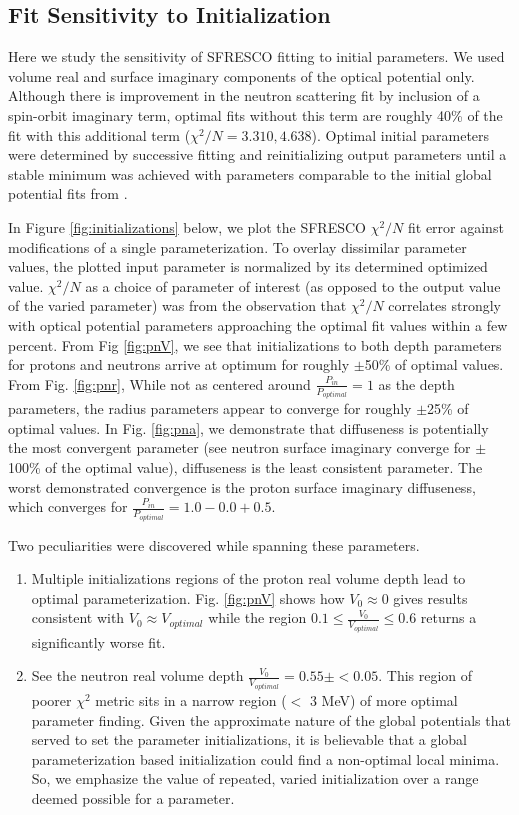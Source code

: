 \subsection{Fit Sensitivity to Initialization}
Here we study the sensitivity of SFRESCO fitting to initial parameters. We used volume real and surface imaginary components of the optical potential only. Although there is improvement in the neutron scattering fit by inclusion of a spin-orbit imaginary term, optimal fits without this term are roughly 40\% of the fit with this additional term ($\chi^2/N = 3.310, 4.638 $). Optimal initial parameters were determined by successive fitting and reinitializing output parameters until a stable minimum was achieved with parameters comparable to the initial global potential fits from \cite{capote2009ripl}.
\par
In Figure \ref{fig:initializations} below, we plot the SFRESCO $\chi^2/N$ fit error against modifications of a single parameterization. To overlay dissimilar parameter values, the plotted input parameter is normalized by its determined optimized value. $\chi^2/N$ as a choice of parameter of interest (as opposed to the output value of the varied parameter) was from the observation that  $\chi^2/N$ correlates strongly with optical potential parameters approaching the optimal fit values within a few percent. From Fig \ref{fig:pnV}, we see that initializations to both depth parameters for protons and neutrons arrive at optimum for roughly $\pm$50\% of optimal values. From Fig. \ref{fig:pnr}, While not as centered around $\frac{P_{in}}{P_{optimal}}=1$ as the depth parameters, the radius parameters appear to converge for roughly $\pm$25\% of optimal values. In Fig. \ref{fig:pna}, we demonstrate that diffuseness is potentially the most convergent parameter (see neutron surface imaginary converge for $\pm$100\% of the optimal value), diffuseness is the least consistent parameter. The worst demonstrated convergence is the proton surface imaginary diffuseness, which converges for $\frac{P_{in}}{P_{optimal}}=1.0-0.0+0.5$.
\par
Two peculiarities were discovered while spanning these parameters.
\begin{enumerate}
	\item Multiple initializations regions of the proton real volume depth lead to optimal parameterization. Fig. \ref{fig:pnV} shows how $V_0\approx 0$ gives results consistent with $V_0 \approx V_{optimal}$ while the region $0.1 \leq \frac{V_0}{V_{optimal}} \leq 0.6$ returns a significantly worse fit.
	\item See the neutron real volume depth $\frac{V_0}{V_{optimal}} = 0.55 \pm <0.05$. This region of poorer $\chi^2$ metric sits in a narrow region ($<$ 3 MeV) of more optimal parameter finding. Given the approximate nature of the global potentials that served to set the parameter initializations, it is believable that a global parameterization based initialization could find a non-optimal local minima. So, we emphasize the value of repeated, varied initialization over a range deemed possible for a parameter.  
\end{enumerate}

